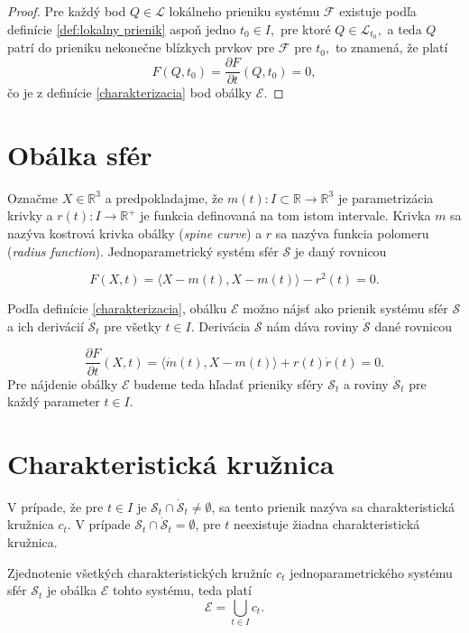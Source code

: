 \begin{proof}
Pre každý bod $Q \in \mathcal{L}$ lokálneho prieniku systému $\mathcal{F}$ existuje podľa definície \ref{def:lokalny prienik} aspoň jedno $t_0 \in I,$ pre ktoré $Q \in \mathcal{L}_{t_0}, $ a teda $Q$ patrí do prieniku nekonečne blízkych prvkov pre $\mathcal{F}$ pre $t_0,$ to znamená, že platí
$$ F(Q, t_0) = \dfrac{\partial F}{\partial t} (Q, t_0) = 0,
$$  
čo je z definície \ref{charakterizacia} bod obálky $\mathcal{E}.$
\end{proof}

\section{Obálka sfér}
Označme $X \in \mathbb{R}^3$ a predpokladajme, že $m(t) \colon I \subset \mathbb{R} \rightarrow \mathbb{R}^3$ je parametrizácia krivky a $r(t) \colon I \rightarrow \mathbb{R}^{+}$ je funkcia definovaná na tom istom intervale. Krivka $m$ sa nazýva kostrová krivka obálky (\textit{spine curve}) a $r$ sa nazýva funkcia polomeru (\textit{radius function}). Jednoparametrický systém sfér $\mathcal{S}$ je daný rovnicou

$$
F(X, t) = \langle X - m(t), X - m(t) \rangle - r^2(t)= 0.
$$

Podľa definície \ref{charakterizacia}, obálku $\mathcal{E}$ možno nájsť ako prienik systému sfér $\mathcal{S}$ a ich derivácií $\mathcal{\dot{S}}_t$ pre všetky $t \in I$. Derivácia $\mathcal{S}$ nám dáva roviny $\mathcal{\dot{S}}$ dané rovnicou

$$
\dfrac{\partial F}{\partial t} (X, t) = \langle \dot{m}(t), X - m(t) \rangle + r(t) \dot{r}(t) = 0.
$$
Pre nájdenie obálky $\mathcal{E}$ budeme teda hľadať prieniky sféry $\mathcal{S}_t$ a roviny $\mathcal{\dot{S}}_t $ pre každý parameter $t \in I$.

\section{Charakteristická kružnica}
\begin{definition}
V prípade, že pre $t \in I$ je $\mathcal{S}_{t} \cap \mathcal{\dot{S}}_{t} \neq \emptyset$, sa tento prienik nazýva sa charakteristická kružnica $c_{t}$. V prípade $\mathcal{S}_{t} \cap \mathcal{\dot{S}}_{t} = \emptyset$, pre \(t\) neexistuje žiadna charakteristická kružnica.
\end{definition}

\begin{lemma} \label{lema o zjednoteni charakteristickych kruznic}
Zjednotenie všetkých charakteristických kružníc $c_{t}$ jednoparametrického systému sfér $\mathcal{S}_t$ je obálka $\mathcal{E}$ tohto systému, teda platí $$\mathcal{E} = \bigcup_{t \in I} c_{t}.$$
\end{lemma}

